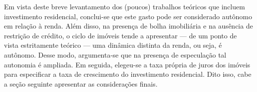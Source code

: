 Em vista deste breve levantamento dos (poucos) trabalhos teóricos que incluem investimento residencial, conclui-se que este gasto pode ser considerado autônomo em relação à renda.
Além disso, na presença de bolha imobiliária e na ausência de restrição de crédito, o ciclo de imóveis tende a apresentar --- de um ponto de vista estritamente teórico --- uma dinâmica distinta da renda, ou seja, é autônomo.
Desse modo, argumenta-se que na presença de especulação tal autonomia é ampliada. 
Em seguida, elegeu-se a taxa própria de juros dos imóveis para especificar a taxa de crescimento do investimento residencial.
Dito isso, cabe a seção seguinte apresentar as considerações finais.





\begin{comment}






Feita esta descrição, Duesenberry pontua: (i) a flutuação dos imóveis decorrente de um desequilíbrio inicial é amortecida; (ii) a flutuação da renda causará flutuações no investimento residencial com defasagem; (iii) este setor possui demanda de reserva e, portanto, os efeitos de uma recessão nesse setor são mais dispersos ao longo do tempo que, por sua vez, contribui para que a perda de dinamismo da renda seja atenuado.

\end{comment}